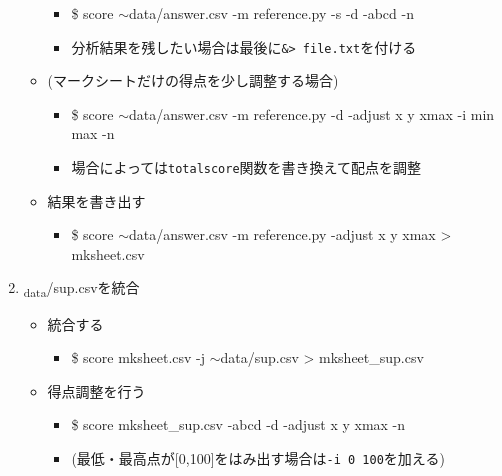 \begin{enumerate}
\begin{itemize}
\begin{itemize}
\item \$ score \ensuremath{\sim}data\slash answer.csv -m reference.py -s -d -abcd -n

\item 分析結果を残したい場合は最後に\texttt{\&> file.txt}を付ける

\end{itemize}

\item (マークシートだけの得点を少し調整する場合)

\begin{itemize}
\item \$ score \ensuremath{\sim}data\slash answer.csv -m reference.py -d -adjust x y xmax -i min max -n

\item 場合によっては\texttt{totalscore}関数を書き換えて配点を調整

\end{itemize}

\item 結果を書き出す

\begin{itemize}
\item \$ score \ensuremath{\sim}data\slash answer.csv -m reference.py -adjust x y xmax > mksheet.csv

\end{itemize}

\end{itemize}

\item \textsubscript{data}\slash sup.csvを統合

\begin{itemize}
\item 統合する

\begin{itemize}
\item \$ score mksheet.csv -j \ensuremath{\sim}data\slash sup.csv > mksheet\_sup.csv

\end{itemize}

\item 得点調整を行う

\begin{itemize}
\item \$ score mksheet\_sup.csv -abcd -d -adjust x y xmax -n

\item (最低・最高点が{[0,100]}をはみ出す場合は\texttt{-i 0 100}を加える)


\end{itemize}
\end{itemize}
\end{enumerate}
